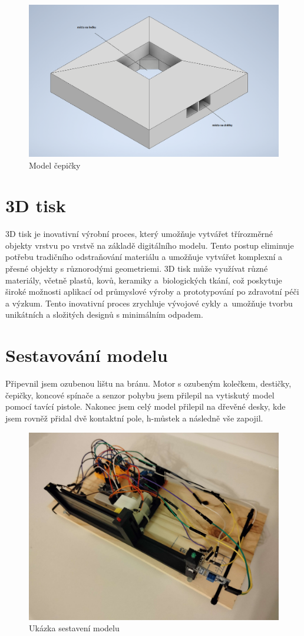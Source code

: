 \documentclass[12pt, a4paper, twoside]{report}
\begin{document}
	\begin{figure}[h]
		\centering
		\includegraphics[width=0.7\linewidth]{image/cepicka.png}
		\caption{Model čepičky}
		\label{fig:cepickaobr} 
	\end{figure}
	
	\newpage
	
	\section{3D tisk}
	
	\noindent 3D tisk je inovativní výrobní proces, který umožňuje vytvářet třírozměrné objekty vrstvu po vrstvě na základě digitálního modelu. Tento postup eliminuje potřebu tradičního odstraňování materiálu a umožňuje vytvářet komplexní a přesné objekty s různorodými geometriemi. 3D tisk může využívat různé materiály, včetně plastů, kovů, keramiky a~biologických tkání, což poskytuje široké možnosti aplikací od průmyslové výroby a prototypování po zdravotní péči a výzkum. Tento inovativní proces zrychluje vývojové cykly a~umožňuje tvorbu unikátních a složitých designů s minimálním odpadem. \\
	
	\section{Sestavování modelu}
	
	\noindent Připevnil jsem ozubenou lištu na bránu. Motor s ozubeným kolečkem, destičky, čepičky, koncové spínače a senzor pohybu jsem přilepil na vytiskutý model pomocí tavící pistole. Nakonec jsem celý model přilepil na dřevěné desky, kde jsem rovněž přidal dvě kontaktní pole, h-můstek a následně vše zapojil. \\
	
	\begin{figure}[h]
		\centering
		\includegraphics[width=0.7\linewidth]{image/sestava.jpg}
		\caption{Ukázka sestavení modelu}
		\label{fig:sestavaobr} 
	\end{figure}
	
\end{document}
